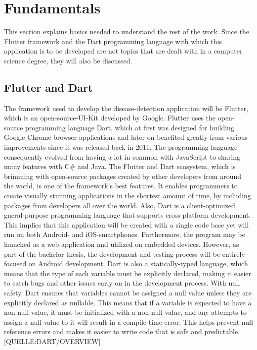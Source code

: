 

\chapter{Fundamentals}
This section explains basics needed to understand the rest of the work. Since the Flutter framework and the Dart programming language with which this application is to be developed are not topics that are dealt with in a computer science degree, they will also be discussed.

\section{Flutter and Dart}
The framework used to develop the disease-detection application will be Flutter, which is an open-source-UI-Kit developed by Google. Flutter uses the open-source programming language Dart, which at first was designed for building Google Chrome browser-applications and later on benefited greatly from various improvements since it was released back in 2011. The programming language consequently evolved from having a lot in common with JavaScript to sharing many features with C\# and Java. The Flutter and Dart ecosystem, which is brimming with open-source packages created by other developers from around the world, is one of the framework's best features. It enables programmers to create visually stunning applications in the shortest amount of time, by including packages from developers all over the world. Also, Dart is a client-optimized gneral-purpose programming language that supports cross-platform development. This implies that this application will be created with a single code base yet will run on both Android- and iOS-smartphones. Furthermore, the program may be launched as a web application and utilized on embedded devices. However, as part of the bachelor thesis, the development and testing process will be entirely focused on Android development. Dart is also a statically-typed language, which means that the type of each variable must be explicitly declared, making it easier to catch bugs and other issues early on in the development process. With null safety, Dart ensures that variables cannot be assigned a null value unless they are explicitly declared as nullable. This means that if a variable is expected to have a non-null value, it must be initialized with a non-null value, and any attempts to assign a null value to it will result in a compile-time error. This helps prevent null reference errors and makes it easier to write code that is safe and predictable. [QUELLE:DART/OVERVIEW]

